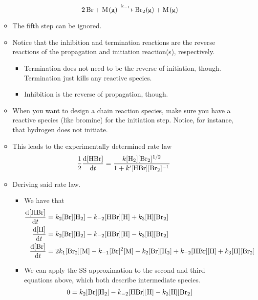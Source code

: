 \documentclass[../notes.tex]{subfiles}
\begin{document}
\begin{itemize}
\begin{itemize}
\begin{itemize}
\begin{equation*}
                \ce{2Br + M(g) ->[k_{-1}] Br2(g) + M(g)}
            \end{equation*}
        \end{itemize}
        \item The fifth step can be ignored.
        \item Notice that the inhibition and termination reactions are the reverse reactions of the propagation and initiation reaction(s), respectively.
        \begin{itemize}
            \item Termination does not need to be the reverse of initiation, though. Termination just kills any reactive species.
            \item Inhibition is the reverse of propagation, though.
        \end{itemize}
        \item When you want to design a chain reaction species, make sure you have a reactive species (like bromine) for the initiation step. Notice, for instance, that hydrogen does not initiate.
        \item This leads to the experimentally determined rate law
        \begin{equation*}
            \frac{1}{2}\dv{[\ce{HBr}]}{t} = \frac{k[\ce{H2}][\ce{Br2}]^{1/2}}{1+k'[\ce{HBr}][\ce{Br2}]^{-1}}
        \end{equation*}
        \item Deriving said rate law.
        \begin{itemize}
            \item We have that
            \begin{align*}
                \dv{[\ce{HBr}]}{t} &= k_2[\ce{Br}][\ce{H2}]-k_{-2}[\ce{HBr}][\ce{H}]+k_3[\ce{H}][\ce{Br2}]\\
                \dv{[\ce{H}]}{t} &= k_2[\ce{Br}][\ce{H2}]-k_{-2}[\ce{HBr}][\ce{H}]-k_3[\ce{H}][\ce{Br2}]\\
                \dv{[\ce{Br}]}{t} &= 2k_1[\ce{Br2}][\ce{M}]-k_{-1}[\ce{Br}]^2[\ce{M}]-k_2[\ce{Br}][\ce{H2}]+k_{-2}[\ce{HBr}][\ce{H}]+k_3[\ce{H}][\ce{Br2}]
            \end{align*}
            \item We can apply the SS approximation to the second and third equations above, which both describe intermediate species.
            \begin{align*}
                0 &= k_2[\ce{Br}][\ce{H2}]-k_{-2}[\ce{HBr}][\ce{H}]-k_3[\ce{H}][\ce{Br2}]\\

\end{align*}
\end{itemize}
\end{itemize}
\end{itemize}
\end{document}
